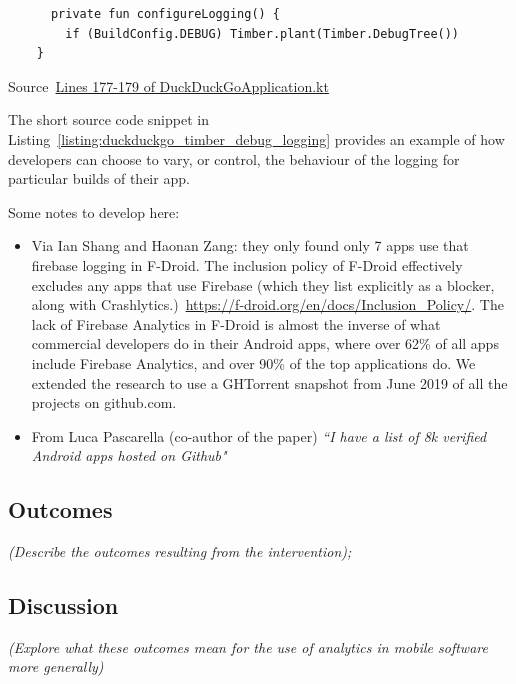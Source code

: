 \begin{listing}
\begin{verbatim}
      private fun configureLogging() {
        if (BuildConfig.DEBUG) Timber.plant(Timber.DebugTree())
    }
\end{verbatim}
\caption{Source~\href{https://github.com/duckduckgo/Android/blob/2f3d42be6a972551c2330daccba6ff4039e1c1a8/app/src/main/java/com/duckduckgo/app/global/DuckDuckGoApplication.kt\#L177-L179}{Lines 177-179 of DuckDuckGoApplication.kt}}
\label{listing:duckduckgo_timber_debug_logging}
\end{listing}

The short source code snippet in Listing~\ref{listing:duckduckgo_timber_debug_logging} provides an example of how developers can choose to vary, or control, the behaviour of the logging for particular builds of their app.



Some notes to develop here:
\begin{itemize}
    \item Via Ian Shang and Haonan Zang: they only found only 7 apps use that firebase logging in F-Droid. The inclusion policy of F-Droid effectively excludes any apps that use Firebase (which they list explicitly as a blocker, along with Crashlytics.)~\url{https://f-droid.org/en/docs/Inclusion_Policy/}. The lack of Firebase Analytics in F-Droid is almost the inverse of what commercial developers do in their Android apps, where over 62\% of all apps include Firebase Analytics, and over 90\% of the top applications do. We extended the research to use a GHTorrent snapshot from  June 2019 of all the projects on github.com.
    \item From Luca Pascarella (co-author of the paper) \emph{``I have a list of 8k verified Android apps hosted on Github"}

\end{itemize}

\subsection{Outcomes} 
\textit{(Describe the outcomes resulting from the intervention); }

\subsection{Discussion} 
\textit{(Explore what these outcomes mean for the use of analytics in mobile software more generally)}

